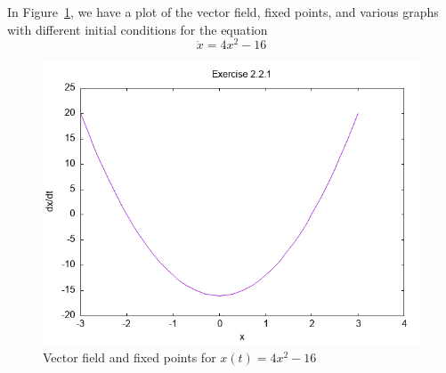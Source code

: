
In Figure~\ref{fig2_2_1vecfield}, we have a plot of the vector field, fixed points,
and various graphs with different initial conditions for the equation 
\[
    \dot{x} = 4x^2 - 16
\]
\begin{figure}[!ht]
    \includegraphics[scale=0.6, center]{../plots/ch02/ex2_2_1.png}
    \caption{Vector field and fixed points for $x(t) = 4x^2 - 16$\label{fig2_2_1vecfield}}
\end{figure}
